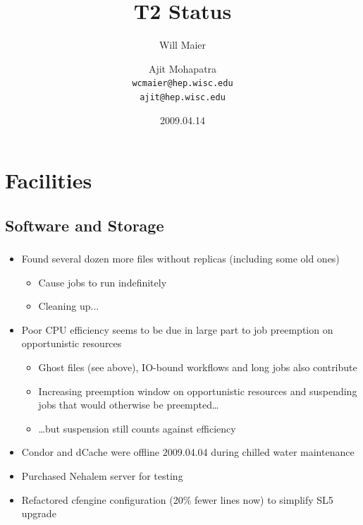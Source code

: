 \documentclass{beamer}
\title{T2 Status}
\author[Maier, Mohapatra]{
    Will Maier \and Ajit Mohapatra\\ 
    {\tt wcmaier@hep.wisc.edu}\\
    {\tt ajit@hep.wisc.edu}}
\institute[Wisconsin]{University of Wisconsin - High Energy Physics}
\date{2009.04.14}
\begin{document}
\begin{frame}
    \titlepage
\end{frame}


\section{Facilities}
\subsection{Software and Storage}
\begin{frame}
\frametitle{}
\begin{itemize}
    \item Found several dozen more files without replicas (including some old ones)
    \begin{itemize}
        \item Cause jobs to run indefinitely
        \item Cleaning up...
    \end{itemize}
    \item Poor CPU efficiency seems to be due in large part to job preemption on opportunistic resources
    \begin{itemize}
        \item Ghost files (see above), IO-bound workflows and long jobs also contribute
        \item Increasing preemption window on opportunistic resources and suspending jobs that would otherwise be preempted\ldots{}
        \item \ldots{}but suspension still counts against efficiency
    \end{itemize}
    \item Condor and dCache were offline 2009.04.04 during chilled water maintenance
    \item Purchased Nehalem server for testing
    \item Refactored cfengine configuration (20\% fewer lines now) to simplify SL5 upgrade
\end{itemize}
\end{frame}
\end{document}
